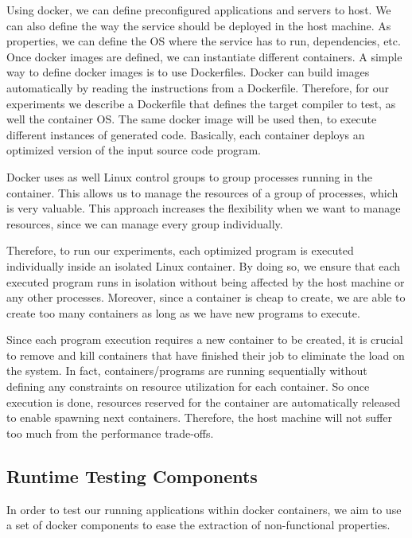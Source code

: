 Using docker, we can define preconfigured applications and servers to host. We can also define the way the service should be deployed in the host machine. 
As properties, we can define the OS where the service has to run, dependencies, etc. Once docker images are defined, we can instantiate different containers.
A simple way to define docker images is to use Dockerfiles. Docker can build images automatically by reading the instructions from a Dockerfile. 
Therefore, for our experiments we describe a Dockerfile that defines the target compiler to test, as well the container OS. The same docker image will be used then, to execute different instances of generated code. Basically, each container deploys an optimized version of the input source code program.

Docker uses as well Linux control groups to group processes running in the container. This allows us to manage the resources of a group of processes, which is very valuable. 
This approach increases the flexibility when we want to manage resources, since we can manage every group individually. 

Therefore, to run our experiments, each optimized program is executed individually inside an isolated Linux container. By doing so, we ensure that each executed program runs in isolation without being affected by the host machine or any other processes. Moreover, since a container is cheap to create, we are able to create too many containers as long as we have new programs to execute.

Since each program execution requires a new container to be created, it is crucial to remove and kill containers that have finished their job to eliminate the load on the system. In fact, containers/programs are running sequentially without defining any constraints on resource utilization for each container. So once execution is done, resources reserved for the container are automatically released to enable spawning next containers. Therefore, the host machine will not suffer too much from the performance trade-offs.

\subsection{Runtime Testing Components}
In order to test our running applications within docker containers, we aim to use a set of docker components to ease the extraction of non-functional properties.
